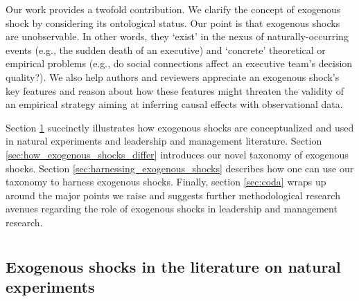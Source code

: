 \documentclass[11pt]{article}
\begin{document}
\begin{refsection}
Our work provides a twofold contribution. We clarify the concept of exogenous
shock by considering its ontological status.  Our point is that exogenous shocks
are unobservable. In other words, they `exist' in the nexus of 
naturally-occurring events (e.g., the sudden death of an executive) and 
`concrete' theoretical or empirical problems (e.g., do social connections affect
an executive team's decision quality?).  We also help authors and reviewers
appreciate an exogenous shock's key features and reason about how these features
might threaten the validity of an empirical strategy aiming at inferring causal
effects with observational data.

Section \ref{sec:what_exogenous_shocks} succinctly illustrates how exogenous 
shocks are conceptualized and used in natural experiments and leadership and management
literature.  Section \ref{sec:how_exogenous_shocks_differ} introduces our novel
taxonomy of exogenous shocks.  Section \ref{sec:harnessing_exogenous_shocks}
describes how one can use our taxonomy to harness exogenous shocks. Finally,
section \ref{sec:coda} wraps up around the major points we raise and suggests
further methodological research avenues regarding the role of exogenous shocks
in leadership and management research.

\section{}
\label{sec:what_exogenous_shocks}

\subsection{Exogenous shocks in the literature on natural experiments}
\label{subsec:exogenous_shocks_and_ne}


\end{refsection}
\end{document}
